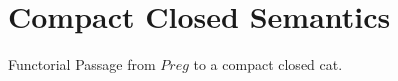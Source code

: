\newcommand{\FinSet}{\mathrm{FinSet}}
\section{Compact Closed Semantics}
%

Functorial Passage from $Preg$ to a compact closed cat. 